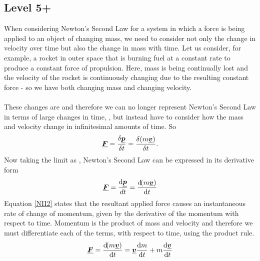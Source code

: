 \subsection{Level 5+}
When considering Newton's Second Law for a system in which a force is being applied to an object of changing mass, we need to consider not only the change in velocity over time but also the change in mass with time.  Let us consider, for example, a rocket in outer space that is burning fuel at a constant rate to produce a constant force of propulsion.  Here, mass is being continually lost and the velocity of the rocket is continuously changing due to the resulting constant force - so we have both changing mass and changing velocity.\\
\\
These changes are  and therefore we can no longer represent Newton's Second Law in terms of large changes in time, , but instead have to consider how the mass and velocity change in infinitesimal amounts of time.  So
\begin{equation}
{\mathit{\underline{\boldsymbol{F}}}}= \frac{\delta{\mathit{\underline{\boldsymbol{p}}}}}{\delta t}= \frac{\delta(m {\mathit{\underline{\boldsymbol{v}}}})}{\delta t}.
\end{equation}
Now taking the limit as , Newton's Second Law can be expressed in its derivative form
\begin{equation}
{\mathit{\underline{\boldsymbol{F}}}}=\frac{\operatorname{d}\!{\mathit{\underline{\boldsymbol{p}}}}}{dt}=\frac{\operatorname{d}\!(m{\mathit{\underline{\boldsymbol{v}}}})}{\operatorname{d}\! t} \label{NII2}
\end{equation}
Equation \ref{NII2} states that the resultant applied force causes an instantaneous rate of change of momentum, given by the derivative of the momentum with respect to time.  Momentum is the product of mass and velocity and therefore we must differentiate each of the terms, with respect to time, using the product rule.
 \begin{equation}
{\mathit{\underline{\boldsymbol{F}}}}=\frac{\operatorname{d}\!(m{\mathit{\underline{\boldsymbol{v}}}})}{\operatorname{d}\! t}={\mathit{\underline{\boldsymbol{v}}}}\frac{\operatorname{d}\! m}{\operatorname{d}\! t}+m\frac{\operatorname{d}\!{\mathit{\underline{\boldsymbol{v}}}}}{\operatorname{d}\! t}
\end{equation}
